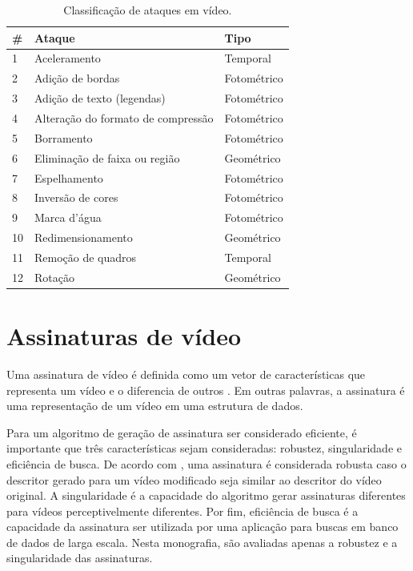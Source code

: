 \begin{table}[!ht]
\centering
\caption{Classificação de ataques em vídeo.}
\label{tab-classificacao-ataques}
\begin{tabular}{|l|l|l|}
\hline
\# & \textbf{Ataque}                    & \textbf{Tipo} \\ \hline
1           & Aceleramento                       & Temporal      \\ \hline
2           & Adição de bordas                   & Fotométrico   \\ \hline
3           & Adição de texto (legendas)         & Fotométrico   \\ \hline
4           & Alteração do formato de compressão & Fotométrico   \\ \hline
5           & Borramento                         & Fotométrico   \\ \hline
6           & Eliminação de faixa ou região      & Geométrico    \\ \hline
7           & Espelhamento                       & Fotométrico   \\ \hline
8           & Inversão de cores                  & Fotométrico   \\ \hline
9           & Marca d'água                       & Fotométrico   \\ \hline
10          & Redimensionamento                  & Geométrico    \\ \hline
11          & Remoção de quadros                 & Temporal      \\ \hline
12          & Rotação                            & Geométrico    \\ \hline
\end{tabular}
\end{table}





\section{Assinaturas de vídeo}
\label{sec:assinatura} 
    
	Uma assinatura de vídeo é definida como um vetor de características que representa um vídeo e o diferencia de outros \cite{lee2008robust}. Em outras palavras, a assinatura é uma representação de um vídeo em uma estrutura de dados. 
        
	Para um algoritmo de geração de assinatura ser considerado eficiente, é importante que três características sejam consideradas: robustez, singularidade e eficiência de busca. De acordo com , uma assinatura é considerada robusta caso o descritor gerado para um vídeo modificado seja similar ao descritor do vídeo original. A singularidade é a capacidade do algoritmo gerar assinaturas diferentes para vídeos perceptivelmente diferentes. Por fim, eficiência de busca é a capacidade da assinatura  ser utilizada por uma aplicação para buscas em banco de dados de larga escala. Nesta monografia, são avaliadas apenas a robustez e a singularidade das assinaturas.   
    
